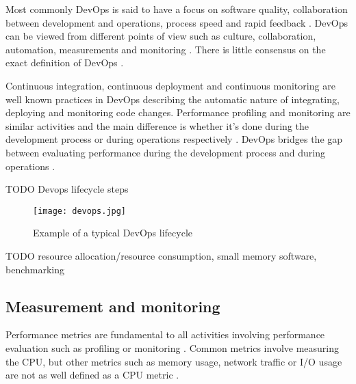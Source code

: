 Most commonly DevOps is said to have a focus on software quality, collaboration between development and operations, process speed and rapid feedback \parencite{mishraDevOpsSoftwareQuality2020,wallerIncludingPerformanceBenchmarks2015, pereraImproveSoftwareQuality2017}. DevOps can be viewed from different points of view such as culture, collaboration, automation, measurements and monitoring \parencite{mishraDevOpsSoftwareQuality2020, wallerIncludingPerformanceBenchmarks2015}. There is little consensus on the exact definition of DevOps \parencite{smedsDevOpsDefinitionPerceived2015}.



Continuous integration, continuous deployment and continuous monitoring are well known practices in DevOps \parencite{wallerIncludingPerformanceBenchmarks2015} describing the automatic nature of integrating, deploying and monitoring code changes. Performance profiling and monitoring are similar activities and the main difference is whether it's done during the development process or during operations respectively \parencite{wallerIncludingPerformanceBenchmarks2015}. DevOps bridges the gap between evaluating performance during the development process and during operations \parencite{brunnertPerformanceorientedDevOpsResearch2015}.

TODO Devops lifecycle steps

\begin{figure}[h]
    \centering
    \texttt{[image: devops.jpg]}
    \caption{Example of a typical DevOps lifecycle}
    \label{fig:devops}
\end{figure}


TODO resource allocation/resource consumption, small memory software, benchmarking

\subsection{Measurement and monitoring}

Performance metrics are fundamental to all activities involving performance evaluation such as profiling or monitoring \parencite{brunnertPerformanceorientedDevOpsResearch2015}. Common metrics involve measuring the CPU, but other metrics such as memory usage, network traffic or I/O usage are not as well defined as a CPU metric \parencite{brunnertPerformanceorientedDevOpsResearch2015}.

